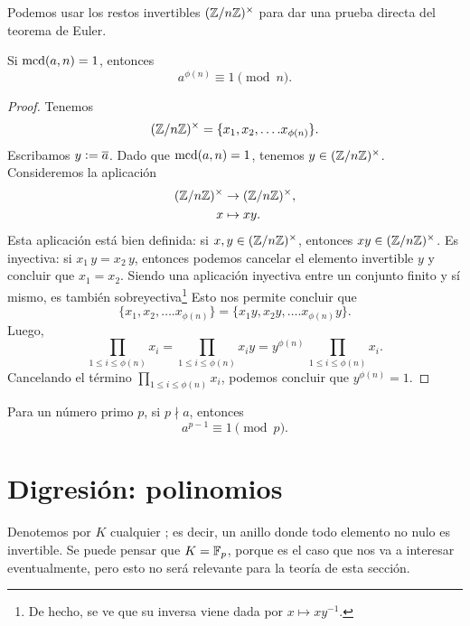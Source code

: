 \documentclass{article}
\theoremstyle{plain}
\begin{document}
Podemos usar los restos invertibles $(\mathbb{Z}/n\mathbb{Z})^\times$ para dar una prueba
directa del teorema de Euler.

\begin{teorema}[Euler]
  \label{thm:Euler}
  Si $\operatorname{mcd} (a,n) = 1$, entonces
  $$a^{\phi (n)} \equiv 1 \pmod{n}.$$

  \begin{proof}
    Tenemos
    $$(\mathbb{Z}/n\mathbb{Z})^\times = \{ x_1, x_2, \ldots. x_{\phi (n)} \}.$$
    Escribamos $y \mathrel{\mathop:}= \overline{a}$. Dado que $\operatorname{mcd} (a,n) = 1$, tenemos
    $y \in (\mathbb{Z}/n\mathbb{Z})^\times$. Consideremos la aplicación
    \begin{align*}
      (\mathbb{Z}/n\mathbb{Z})^\times & \to (\mathbb{Z}/n\mathbb{Z})^\times,\\
      x & \mapsto xy.
    \end{align*}
    Esta aplicación está bien definida: si $x,y \in (\mathbb{Z}/n\mathbb{Z})^\times$, entonces
    $xy \in (\mathbb{Z}/n\mathbb{Z})^\times$. Es inyectiva: si $x_1\,y = x_2\,y$, entonces
    podemos cancelar el elemento invertible $y$ y concluir que $x_1 =
    x_2$. Siendo una aplicación inyectiva entre un conjunto finito y sí mismo,
    es también sobreyectiva\footnote{De hecho, se ve que su inversa viene dada
      por $x \mapsto xy^{-1}$.} Esto nos permite concluir que
    $$\{ x_1, x_2, \ldots. x_{\phi (n)} \} = \{ x_1 y, x_2 y, \ldots. x_{\phi (n)} y \}.$$
    Luego,
    \[ \prod_{1 \le i \le \phi (n)} x_i =
      \prod_{1 \le i \le \phi (n)} x_i y =
      y^{\phi (n)} \, \prod_{1 \le i \le \phi (n)} x_i. \]
    Cancelando el término $\prod\limits_{1 \le i \le \phi (n)} x_i$, podemos
    concluir que $y^{\phi (n)} = 1$.
\end{proof}
\end{teorema}

\begin{corolario}
  Para un número primo $p$, si $p \nmid a$, entonces
  $$a^{p-1} \equiv 1 \pmod{p}.$$
\end{corolario}


\section{Digresión: polinomios}

Denotemos por $K$ cualquier ; es decir, un anillo donde todo
elemento no nulo es invertible. Se puede pensar que $K = \mathbb{F}_p$, porque es el
caso que nos va a interesar eventualmente, pero esto no será relevante para la
teoría de esta sección.
\end{document}
